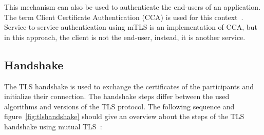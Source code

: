 This mechanism can also be used to authenticate the end-users of an application.
The term Client Certificate Authentication (CCA) is used for this context~\cite{parsovs2013practical}.
Service-to-service authentication using mTLS is an implementation of CCA, but in this approach, the client is not the end-user, instead, it is another service.

\subsection{Handshake}
\label{sec:tlshandshake_details}
The TLS handshake is used to exchange the certificates of the participants and initialize their connection.
The handshake steps differ between the used algorithms and versions of the TLS protocol.
The following sequence and figure~\ref{fig:tlshandshake} should give an overview about the steps of the TLS handshake using mutual TLS~\cite{parsovs2013practical}:
